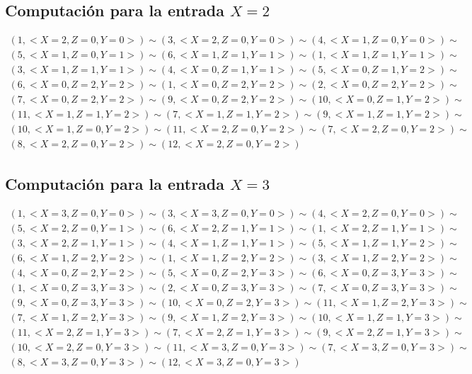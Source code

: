 \documentclass[a4paper]{article}
\begin{document}
		\subsection{Computación para la entrada $X=2$}
		\begin{equation*}\begin{gathered}
		(1, <X=2, Z=0, Y=0>) \sim (3, <X=2, Z=0, Y=0>) \sim (4, <X=1, Z=0, Y=0>) \sim\\
		(5, <X=1, Z=0, Y=1>) \sim (6, <X=1, Z=1, Y=1>) \sim (1, <X=1, Z=1, Y=1>) \sim\\
		(3, <X=1, Z=1, Y=1>) \sim (4, <X=0, Z=1, Y=1>) \sim (5, <X=0, Z=1, Y=2>) \sim\\
		(6, <X=0, Z=2, Y=2>) \sim (1, <X=0, Z=2, Y=2>) \sim (2, <X=0, Z=2, Y=2>) \sim\\
		(7, <X=0, Z=2, Y=2>) \sim (9, <X=0, Z=2, Y=2>) \sim (10, <X=0, Z=1, Y=2>) \sim\\
		(11, <X=1, Z=1, Y=2>) \sim (7, <X=1, Z=1, Y=2>) \sim (9, <X=1, Z=1, Y=2>) \sim\\
		(10, <X=1, Z=0, Y=2>) \sim (11, <X=2, Z=0, Y=2>) \sim (7, <X=2, Z=0, Y=2>) \sim\\
		(8, <X=2, Z=0, Y=2>) \sim (12, <X=2, Z=0, Y=2>)
		\end{gathered}\end{equation*}
		\subsection{Computación para la entrada $X=3$}
		\begin{equation*}\begin{gathered}
		(1, <X=3, Z=0, Y=0>) \sim (3, <X=3, Z=0, Y=0>) \sim (4, <X=2, Z=0, Y=0>) \sim\\
		(5, <X=2, Z=0, Y=1>) \sim (6, <X=2, Z=1, Y=1>) \sim (1, <X=2, Z=1, Y=1>) \sim\\
		(3, <X=2, Z=1, Y=1>) \sim (4, <X=1, Z=1, Y=1>) \sim (5, <X=1, Z=1, Y=2>) \sim\\
		(6, <X=1, Z=2, Y=2>) \sim (1, <X=1, Z=2, Y=2>) \sim (3, <X=1, Z=2, Y=2>) \sim\\
		(4, <X=0, Z=2, Y=2>) \sim (5, <X=0, Z=2, Y=3>) \sim (6, <X=0, Z=3, Y=3>) \sim\\
		(1, <X=0, Z=3, Y=3>) \sim (2, <X=0, Z=3, Y=3>) \sim (7, <X=0, Z=3, Y=3>) \sim\\
		(9, <X=0, Z=3, Y=3>) \sim (10, <X=0, Z=2, Y=3>) \sim (11, <X=1, Z=2, Y=3>) \sim\\
		(7, <X=1, Z=2, Y=3>) \sim (9, <X=1, Z=2, Y=3>) \sim (10, <X=1, Z=1, Y=3>) \sim\\
		(11, <X=2, Z=1, Y=3>) \sim (7, <X=2, Z=1, Y=3>) \sim (9, <X=2, Z=1, Y=3>) \sim\\
		(10, <X=2, Z=0, Y=3>) \sim (11, <X=3, Z=0, Y=3>) \sim (7, <X=3, Z=0, Y=3>) \sim\\
		(8, <X=3, Z=0, Y=3>) \sim (12, <X=3, Z=0, Y=3>)
		\end{gathered}\end{equation*}
\end{document}
